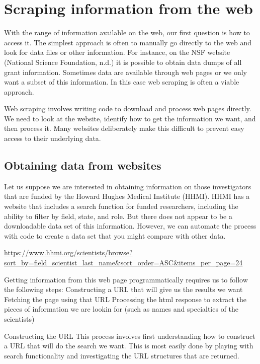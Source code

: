\documentclass[]{krantz}
\begin{document}
\section{Scraping information from the web}\label{sec:4-1}

With the range of information available on the web, our first question
is how to access it. The simplest approach is often to manually go
directly to the web and look for data files or other information. For
instance, on the NSF website (National Science Foundation, n.d.) it is
possible to obtain data dumps of all grant information. Sometimes data
are available through web pages or we only want a subset of this
information. In this case web scraping is often a viable approach.

Web scraping involves writing code to download and process web pages
directly. We need to look at the website, identify how to get the
information we want, and then process it. Many websites deliberately
make this difficult to prevent easy access to their underlying data.

\subsection{Obtaining data from websites}\label{sec:4-1.1}

Let us suppose we are interested in obtaining information on those
investigators that are funded by the Howard Hughes Medical Institute
(HHMI). HHMI has a website that includes a search function for funded
researchers, including the ability to filter by field, state, and role.
But there does not appear to be a downloadable data set of this
information. However, we can automate the process with code to create a
data set that you might compare with other data.

\url{https://www.hhmi.org/scientists/browse?sort_by=field_scientist_last_name\&sort_order=ASC\&items_per_page=24}

Getting information from this web page programmatically requires us to
follow the following steps: Constructing a URL that will give us the
results we want Fetching the page using that URL Processing the html
response to extract the pieces of information we are lookin for (such as
names and specialties of the scientists)

Constructing the URL This process involves first understanding how to
construct a URL that will do the search we want. This is most easily
done by playing with search functionality and investigating the URL
structures that are returned.
\end{document}
